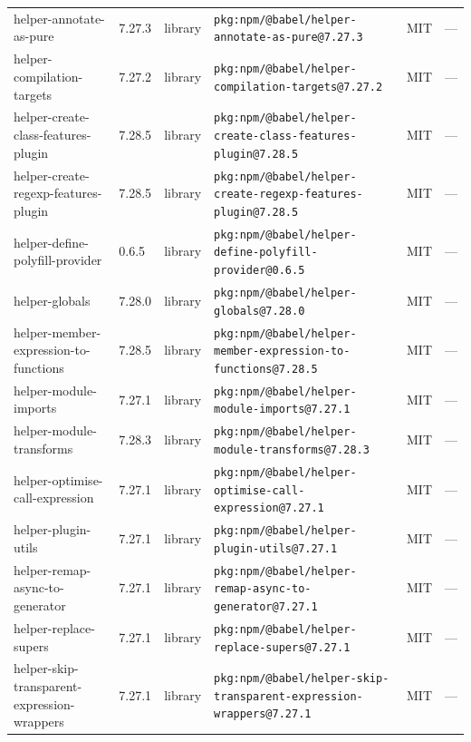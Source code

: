 \documentclass[11pt,a4paper]{article}
\begin{document}
\begin{longtable}{|p{4cm}|p{2cm}|p{1.6cm}|p{5cm}|p{1.5cm}|p{3.5cm}|}
\raggedright helper-annotate-as-pure & 7.27.3 & library & \small\texttt{pkg:npm/@babel/helper-annotate-as-pure@7.27.3} & MIT & \small — \\
\raggedright helper-compilation-targets & 7.27.2 & library & \small\texttt{pkg:npm/@babel/helper-compilation-targets@7.27.2} & MIT & \small — \\
\raggedright helper-create-class-features-plugin & 7.28.5 & library & \small\texttt{pkg:npm/@babel/helper-create-class-features-plugin@7.28.5} & MIT & \small — \\
\raggedright helper-create-regexp-features-plugin & 7.28.5 & library & \small\texttt{pkg:npm/@babel/helper-create-regexp-features-plugin@7.28.5} & MIT & \small — \\
\raggedright helper-define-polyfill-provider & 0.6.5 & library & \small\texttt{pkg:npm/@babel/helper-define-polyfill-provider@0.6.5} & MIT & \small — \\
\raggedright helper-globals & 7.28.0 & library & \small\texttt{pkg:npm/@babel/helper-globals@7.28.0} & MIT & \small — \\
\raggedright helper-member-expression-to-functions & 7.28.5 & library & \small\texttt{pkg:npm/@babel/helper-member-expression-to-functions@7.28.5} & MIT & \small — \\
\raggedright helper-module-imports & 7.27.1 & library & \small\texttt{pkg:npm/@babel/helper-module-imports@7.27.1} & MIT & \small — \\
\raggedright helper-module-transforms & 7.28.3 & library & \small\texttt{pkg:npm/@babel/helper-module-transforms@7.28.3} & MIT & \small — \\
\raggedright helper-optimise-call-expression & 7.27.1 & library & \small\texttt{pkg:npm/@babel/helper-optimise-call-expression@7.27.1} & MIT & \small — \\
\raggedright helper-plugin-utils & 7.27.1 & library & \small\texttt{pkg:npm/@babel/helper-plugin-utils@7.27.1} & MIT & \small — \\
\raggedright helper-remap-async-to-generator & 7.27.1 & library & \small\texttt{pkg:npm/@babel/helper-remap-async-to-generator@7.27.1} & MIT & \small — \\
\raggedright helper-replace-supers & 7.27.1 & library & \small\texttt{pkg:npm/@babel/helper-replace-supers@7.27.1} & MIT & \small — \\
\raggedright helper-skip-transparent-expression-wrappers & 7.27.1 & library & \small\texttt{pkg:npm/@babel/helper-skip-transparent-expression-wrappers@7.27.1} & MIT & \small — \\

\end{longtable}
\end{document}
